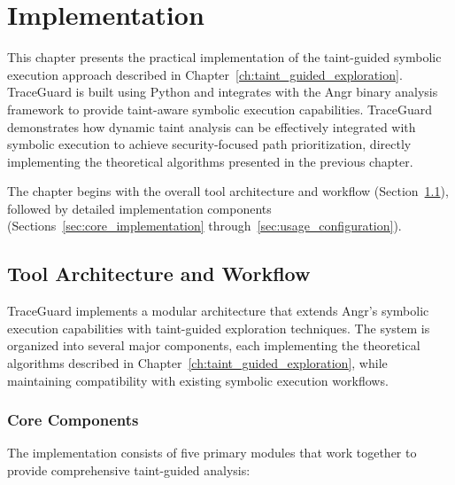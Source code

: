 \chapter{Implementation}

This chapter presents the practical implementation of the taint-guided symbolic execution approach described in Chapter~\ref{ch:taint_guided_exploration}. TraceGuard is built using Python and integrates with the Angr binary analysis framework to provide taint-aware symbolic execution capabilities. TraceGuard demonstrates how dynamic taint analysis can be effectively integrated with symbolic execution to achieve security-focused path prioritization, directly implementing the theoretical algorithms presented in the previous chapter.

The chapter begins with the overall tool architecture and workflow (Section~\ref{sec:tool_architecture}), followed by detailed implementation components (Sections~\ref{sec:core_implementation} through~\ref{sec:usage_configuration}).

\section{Tool Architecture and Workflow}\label{sec:tool_architecture}

TraceGuard implements a modular architecture that extends Angr's symbolic execution capabilities with taint-guided exploration techniques. The system is organized into several major components, each implementing the theoretical algorithms described in Chapter~\ref{ch:taint_guided_exploration}, while maintaining compatibility with existing symbolic execution workflows.

\subsection{Core Components}

The implementation consists of five primary modules that work together to provide comprehensive taint-guided analysis:

